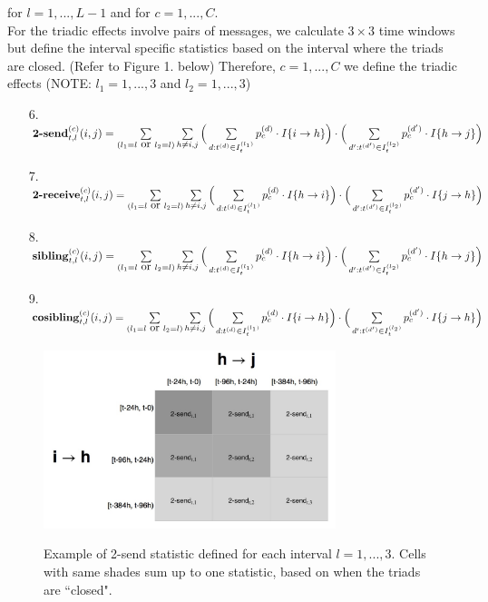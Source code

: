 \documentclass[a4paper]{article}
\begin{document}
for $l=1,...,L-1$ and for $c = 1,...,C$. \\ \newline For the triadic effects involve pairs of messages, we calculate $3 \times 3$ time windows but define the interval specific statistics based on the interval where the triads are closed. (Refer to Figure 1. below) Therefore, $c=1,...,C$ we define the triadic effects (NOTE: $l_1 = 1,...,3$ and $l_2 = 1,...,3$)
\begin{itemize}
	 	\item [6.] $\mbox{\textbf{2-send}}^{(c)}_{t, l}(i, j)=\sum\limits_{\substack{(l_1= l \mbox { or }  l_2 = l)} }\sum\limits_{h \neq i, j}\Big(\sum\limits_{d: t^{(d)} \in I_{t}^{(l_1)}}p_c^{(d)}\cdot I\{i\rightarrow h\}\Big)\cdot \Big(\sum\limits_{d': t^{(d')} \in I_{t}^{( l_2)}}p_c^{(d')}\cdot I\{h\rightarrow j\}\Big)$
 	\item [7.] $\mbox{\textbf{2-receive}}^{(c)}_{t, l}(i, j)=\sum\limits_{\substack{(l_1= l \mbox { or }  l_2 = l)} }\sum\limits_{h \neq i, j}\Big(\sum\limits_{d: t^{(d)} \in I_t^{(l_1)}}p_c^{(d)}\cdot I\{h\rightarrow i\}\Big)\cdot \Big(\sum\limits_{d': t^{(d')} \in I_t^{(l_2)}}p_c^{(d')}\cdot I\{j\rightarrow h\}\Big)$
 	\item [8.] $\mbox{\textbf{sibling}}^{(c)}_{t, l}(i, j)=\sum\limits_{\substack{(l_1= l \mbox { or }  l_2 = l)} }\sum\limits_{h \neq i, j}\Big(\sum\limits_{d: t^{(d)} \in I_t^{(l_1)}}p_c^{(d)}\cdot I\{h\rightarrow i\}\Big)\cdot \Big(\sum\limits_{d': t^{(d')} \in I_t^{(l_2)}}p_c^{(d')}\cdot I\{h\rightarrow j\}\Big)$
 	\item [9.] $\mbox{\textbf{cosibling}}^{(c)}_{t, l}(i, j)=\sum\limits_{\substack{(l_1= l \mbox { or }  l_2 = l)} }\sum\limits_{h \neq i, j}\Big(\sum\limits_{d: t^{(d)} \in I_t^{(l_1)}}p_c^{(d)}\cdot I\{i\rightarrow h\}\Big)\cdot \Big(\sum\limits_{d': t^{(d')} \in I_t^{(l_2)}}p_c^{(d')}\cdot I\{j\rightarrow h\}\Big)$
 \end{itemize}
 \begin{figure}[ht]
 	\centering
 	\includegraphics[width=0.76\textwidth]{triadtable.jpg} 
 	\label{fig:sim1diag}
 	\caption{Example of 2-send statistic defined for each interval $l=1,...,3$. Cells with same shades sum up to one statistic, based on when the triads are ``closed".}
 \end{figure}
\end{document}
